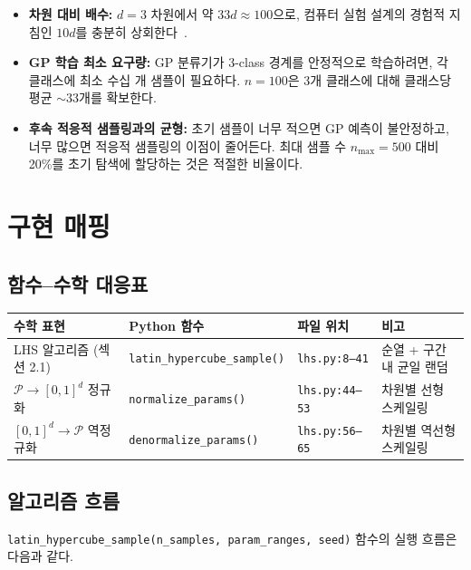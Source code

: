 \documentclass[11pt]{article}
\begin{document}
\begin{itemize}[nosep]
  \item \textbf{차원 대비 배수:}
    $d = 3$ 차원에서 약 $33d \approx 100$으로,
    컴퓨터 실험 설계의 경험적 지침인 $10d$를 충분히 상회한다~\cite{Loeppky2009}.
  \item \textbf{GP 학습 최소 요구량:}
    GP 분류기가 3-class 경계를 안정적으로 학습하려면,
    각 클래스에 최소 수십 개 샘플이 필요하다.
    $n = 100$은 3개 클래스에 대해 클래스당 평균 $\sim 33$개를 확보한다.
  \item \textbf{후속 적응적 샘플링과의 균형:}
    초기 샘플이 너무 적으면 GP 예측이 불안정하고,
    너무 많으면 적응적 샘플링의 이점이 줄어든다.
    최대 샘플 수 $n_{\max} = 500$ 대비 20\%를 초기 탐색에 할당하는 것은 적절한 비율이다.
\end{itemize}


\section{구현 매핑}

\subsection{함수--수학 대응표}

\begin{table}[h]
\centering
\begin{tabular}{llll}
\toprule
수학 표현 & Python 함수 & 파일 위치 & 비고 \\
\midrule
LHS 알고리즘 (섹션 2.1) & \texttt{latin\_hypercube\_sample()} & \texttt{lhs.py:8--41} & 순열 + 구간 내 균일 랜덤 \\
$\mathcal{P} \to [0,1]^d$ 정규화 & \texttt{normalize\_params()} & \texttt{lhs.py:44--53} & 차원별 선형 스케일링 \\
$[0,1]^d \to \mathcal{P}$ 역정규화 & \texttt{denormalize\_params()} & \texttt{lhs.py:56--65} & 차원별 역선형 스케일링 \\
\bottomrule
\end{tabular}
\end{table}

\subsection{알고리즘 흐름}

\texttt{latin\_hypercube\_sample(n\_samples, param\_ranges, seed)} 함수의 실행 흐름은 다음과 같다.
\end{document}
